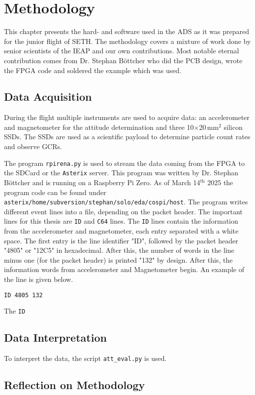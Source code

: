 \chapter{Methodology \label{ch:methodology}}
This chapter presents the hard- and software used in the \ac{ADS} as it was prepared for the junior flight of \ac{SETH}. The methodology covers a mixture of work done by senior scientists of the \ac{IEAP} and our own contributions. Most notable eternal contribution comes from Dr. Stephan Böttcher who did the \ac{PCB} design, wrote the \ac{FPGA} code and soldered the example which was used. 

\section{Data Acquisition \label{sec:meth:data_acquisition}}
During the flight multiple instruments are used to acquire data: an accelerometer and magnetometer for the attitude determination and three 10$\times$20\,mm$^2$ silicon \acfp{SSD}. The \acp{SSD} are used as a scientific payload to determine particle count rates and observe \acp{GCR}.

The program \verb|rpirena.py| is used to stream the data coming from the \ac{FPGA} to the SD\:Card or the \verb|Asterix| server. This program was written by Dr. Stephan Böttcher and is running on a Raspberry Pi Zero. As of March 14$^\mathrm{th}$ 2025 the program code can be found under \verb|asterix/home/subversion/stephan/solo/eda/cospi/host|. The program writes different event lines into a file, depending on the packet header. The important lines for this thesis are \verb|ID| and \verb|C64| lines. The \verb|ID| lines contain the information from the accelerometer and magnetometer, each entry separated with a white space. The first entry is the line identifier "ID", followed by the packet header "4805" or "12C5" in hexadecimal. After this, the number of words in the line minus one (for the packet header) is printed "132" by design. After this, the information words from accelerometer and Magnetometer begin. An example of the line is given below.
\begin{lstlisting}
ID 4805 132 
\end{lstlisting}

The \verb|ID| 

\section{Data Interpretation \label{sec:meth:data_interpretation}}
To interpret the data, the script \verb|att_eval.py| is used.


\section{Reflection on Methodology \label{sec:meth:reflection_methodology}}